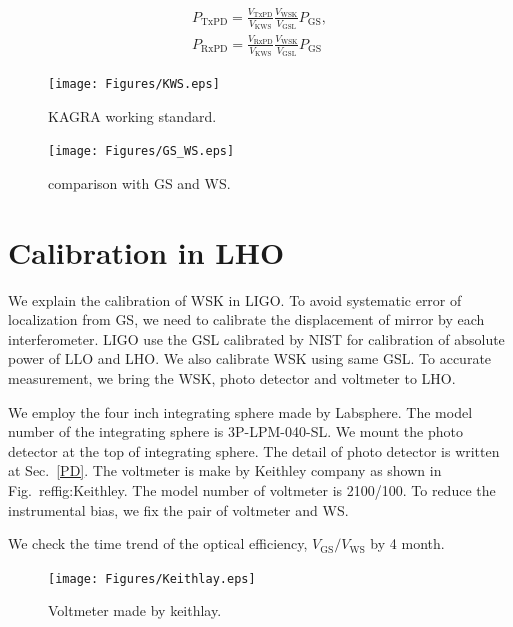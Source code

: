 \begin{eqnarray}
P_{\mathrm{TxPD}}=\frac{V_{\mathrm{TxPD}}}{V_{\mathrm{KWS}}}\frac{V_{\mathrm{WSK}}}{V_{\mathrm{GSL}}}P_{\mathrm{GS}}, \\
P_{\mathrm{RxPD}}=\frac{V_{\mathrm{RxPD}}}{V_{\mathrm{KWS}}}\frac{V_{\mathrm{WSK}}}{V_{\mathrm{GSL}}}P_{\mathrm{GS}}
\end{eqnarray}

\begin{figure}
\begin{center}
\texttt{[image: Figures/KWS.eps]}
\caption{KAGRA working standard.} 
\label{fig:KWS} 
\end{center}
\end{figure}

\begin{figure}
\begin{center}
\texttt{[image: Figures/GS\_WS.eps]}
\caption{comparison with GS and WS.} 
\label{fig:GS_WS} 
\end{center}
\end{figure}

\section{Calibration in LHO}
We explain the calibration of WSK in LIGO.
To avoid systematic error of localization from GS, we need to calibrate the displacement of mirror by each interferometer. LIGO use the GSL calibrated by NIST for calibration of absolute power of LLO and LHO.
We also calibrate WSK using same GSL.
To accurate measurement, we bring the WSK, photo detector and voltmeter to LHO.

We employ  the four inch integrating sphere made by Labsphere. The model number of the integrating sphere is 3P-LPM-040-SL. We mount the photo detector at the top of integrating sphere.
The detail of photo detector is written at Sec.~\ref{PD}.
The voltmeter is make by Keithley company as shown in Fig.~ref{fig:Keithley}. The model number of voltmeter is 2100/100. To reduce the instrumental bias, we fix the pair of voltmeter and WS. 

We check the time trend of the optical efficiency, $V_{\mathrm{GS}}/V_{\mathrm{WS}}$ by 4 month.
\begin{figure}
\begin{center}
\texttt{[image: Figures/Keithlay.eps]}
\caption{Voltmeter made by keithlay.} 
\label{fig:Keithley} 
\end{center}
\end{figure}
